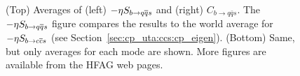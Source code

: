 \begin{figure}[htb]
\begin{center}
{    }
    \hfill
  \end{center}
  \vspace{-0.8cm}
  \caption{
    (Top)
    Averages of 
    (left) $-\etacp S_{b \to q\bar q s}$ and (right) $C_{b \to q\bar q s}$.
    The $-\etacp S_{b \to q\bar q s}$ figure compares the results to 
    the world average 
    for $-\etacp S_{b \to c\bar c s}$ (see Section~\ref{sec:cp_uta:ccs:cp_eigen}).
    (Bottom) Same, but only averages for each mode are shown.
    More figures are available from the HFAG web pages.
  }
  \label{fig:cp_uta:qqs}
\end{figure}

